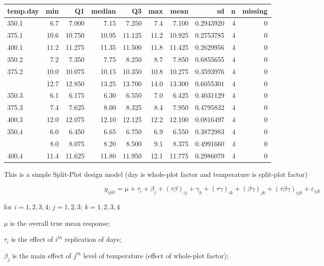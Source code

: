 \documentclass[12pt,]{article}
\begin{document}
\begin{table}[H]
\centering\begingroup\fontsize{8}{10}\selectfont

\begin{tabular}{lrrrrr>{\columncolor[HTML]{EAFAF1}}rrrr}
\toprule
temp.day & min & Q1 & median & Q3 & max & mean & sd & n & missing\\
\midrule
350.1 & 6.7 & 7.000 & 7.15 & 7.250 & 7.4 & 7.100 & 0.2943920 & 4 & 0\\
375.1 & 10.6 & 10.750 & 10.95 & 11.125 & 11.2 & 10.925 & 0.2753785 & 4 & 0\\
400.1 & 11.2 & 11.275 & 11.35 & 11.500 & 11.8 & 11.425 & 0.2629956 & 4 & 0\\
350.2 & 7.2 & 7.350 & 7.75 & 8.250 & 8.7 & 7.850 & 0.6855655 & 4 & 0\\
375.2 & 10.0 & 10.075 & 10.15 & 10.350 & 10.8 & 10.275 & 0.3593976 & 4 & 0\\
\addlinespace
400.2 & 12.7 & 12.850 & 13.25 & 13.700 & 14.0 & 13.300 & 0.6055301 & 4 & 0\\
350.3 & 6.1 & 6.175 & 6.30 & 6.550 & 7.0 & 6.425 & 0.4031129 & 4 & 0\\
375.3 & 7.4 & 7.625 & 8.00 & 8.325 & 8.4 & 7.950 & 0.4795832 & 4 & 0\\
400.3 & 12.0 & 12.075 & 12.10 & 12.125 & 12.2 & 12.100 & 0.0816497 & 4 & 0\\
350.4 & 6.0 & 6.450 & 6.65 & 6.750 & 6.9 & 6.550 & 0.3872983 & 4 & 0\\
\addlinespace
375.4 & 8.0 & 8.075 & 8.20 & 8.500 & 9.1 & 8.375 & 0.4991660 & 4 & 0\\
400.4 & 11.4 & 11.625 & 11.80 & 11.950 & 12.1 & 11.775 & 0.2986079 & 4 & 0\\
\bottomrule
\end{tabular}
\endgroup{}
\end{table}

This is a simple Split-Plot design model (day is whole-plot factor and
temperature is split-plot factor)

\[y_{ijkl}=\mu+\tau_i+\beta_{j}+(\tau\beta)_{ij}+\gamma_{k}+(\tau\gamma)_{ik}+(\beta\gamma)_{jk}+(\tau\beta\gamma)_{ijk}+\varepsilon_{ijk}\]

for \(i=1,2,3,4\); \(j=1,2,3\); \(k=1,2,3,4\)

\(\mu\) is the overall true mean response;

\(\tau_i\) is the effect of \(i^{th}\) replication of days;

\(\beta_{j}\) is the main effect of \(j^{th}\) level of temperature
(effect of whole-plot factor);
\end{document}
